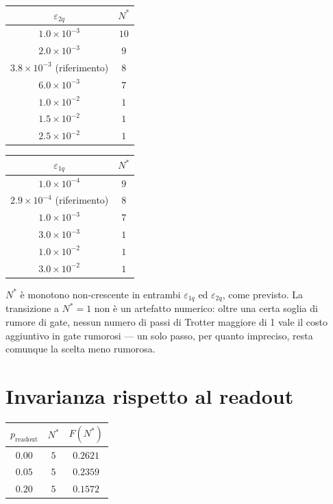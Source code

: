 \documentclass[11pt,a4paper]{article}
\begin{document}
\FloatBarrier

\begin{center}
\renewcommand{\arraystretch}{1.15}
\small
\begin{tabular}{@{}cc@{}}
\toprule
$\varepsilon_{2q}$ & $N^*$\\
\midrule
$1.0\times10^{-3}$ & $10$\\
$2.0\times10^{-3}$ & $9$\\
$3.8\times10^{-3}$ (riferimento) & $8$\\
$6.0\times10^{-3}$ & $7$\\
$1.0\times10^{-2}$ & $1$\\
$1.5\times10^{-2}$ & $1$\\
$2.5\times10^{-2}$ & $1$\\
\bottomrule
\end{tabular}
\qquad
\begin{tabular}{@{}cc@{}}
\toprule
$\varepsilon_{1q}$ & $N^*$\\
\midrule
$1.0\times10^{-4}$ & $9$\\
$2.9\times10^{-4}$ (riferimento) & $8$\\
$1.0\times10^{-3}$ & $7$\\
$3.0\times10^{-3}$ & $1$\\
$1.0\times10^{-2}$ & $1$\\
$3.0\times10^{-2}$ & $1$\\
\bottomrule
\end{tabular}
\end{center}

$N^*$ è monotono non-crescente in entrambi $\varepsilon_{1q}$ ed
$\varepsilon_{2q}$, come previsto. La transizione a $N^*=1$ non è un
artefatto numerico: oltre una certa soglia di rumore di gate, nessun numero di
passi di Trotter maggiore di 1 vale il costo aggiuntivo in gate rumorosi ---
un solo passo, per quanto impreciso, resta comunque la scelta meno rumorosa.

\section{Invarianza rispetto al readout}

\begin{center}
\renewcommand{\arraystretch}{1.2}
\begin{tabular}{@{}ccc@{}}
\toprule
$p_\text{readout}$ & $N^*$ & $F(N^*)$\\
\midrule
$0.00$ & $5$ & $0.2621$\\
$0.05$ & $5$ & $0.2359$\\
$0.20$ & $5$ & $0.1572$\\
\bottomrule
\end{tabular}
\end{center}
\end{document}
